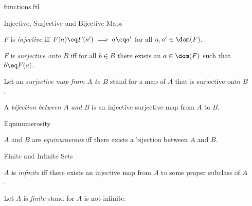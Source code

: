 \documentclass{naproche-library}
\begin{document}
\begin{smodule}[title=Functions and Maps]{functions.ftl}
\begin{sfragment}{Injective, Surjective and Bijective Maps}
  \begin{definition*}[forthel,id=InjectionDef]
    $F$ is \emph{injective} iff $F(a)\eq F(a')\implies a\eq a'$ for all $a,a'\in\dom(F)$.
  \end{definition*}

  \begin{definition*}[forthel,id=SurjectionDef]
    $F$ is \emph{surjective onto $B$} iff for all $b\in B$ there exists an $a\in\dom(F)$ such that $b\eq F(a)$.

    Let an \emph{surjective map from $A$ to $B$} stand for a map of $A$ that is surjective onto $B$.
  \end{definition*}

  \begin{definition*}[forthel,id=BijectionDef]
    A \emph{bijection between $A$ and $B$} is an injective surjective map from $A$ to $B$.
  \end{definition*}
\end{sfragment}

\begin{sfragment}{Equinumerosity}
  \begin{definition*}[forthel,id=EquinumerousDef]
    $A$ and $B$ are \emph{equinumerous} iff there exists a bijection between $A$ and $B$.
  \end{definition*}
\end{sfragment}

\begin{sfragment}{Finite and Infinite Sets}
  \begin{definition*}[forthel,id=InfiniteDef]
    $A$ is \emph{infinite} iff there exists an injective map from $A$ to some proper subclass of $A$.

    Let $A$ is \emph{finite} stand for $A$ is not infinite.
  \end{definition*}
\end{sfragment}
\end{smodule}
\end{document}
